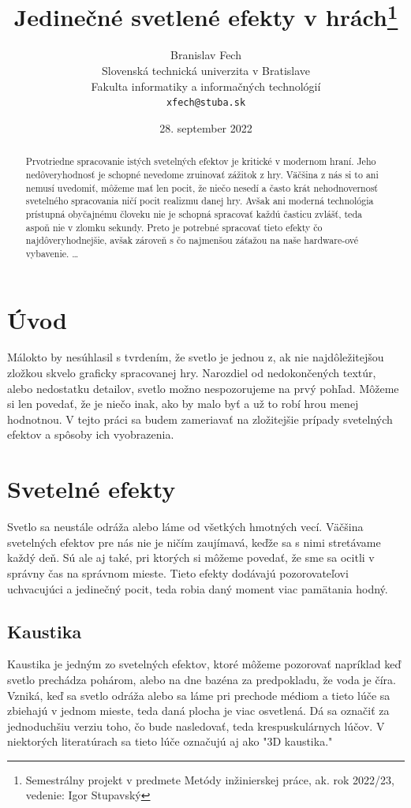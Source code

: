 \documentclass[10pt,twoside,slovak,a4paper]{article}
\title{Jedinečné svetlené efekty v hrách\thanks{Semestrálny projekt v predmete Metódy inžinierskej práce, ak. rok 2022/23, vedenie: Igor Stupavský}} %
\author{Branislav Fech\\[2pt]
	{\small Slovenská technická univerzita v Bratislave}\\
	{\small Fakulta informatiky a informačných technológií}\\
	{\small \texttt{xfech@stuba.sk}}
	}
\date{\small 28. september 2022} %
\begin{document}
\maketitle

\begin{abstract}
Prvotriedne spracovanie istých svetelných efektov je kritické v modernom hraní. 
Jeho nedôveryhodnosť je schopné nevedome zruinovať zážitok z hry. Väčšina z nás 
si to ani nemusí uvedomiť, môžeme mať len pocit, že niečo nesedí a často krát 
nehodnovernosť svetelného spracovania ničí pocit realizmu danej hry. Avšak ani 
moderná technológia prístupná obyčajnému človeku nie je schopná spracovať každú 
časticu zvlášť, teda aspoň nie v zlomku sekundy. Preto je potrebné spracovať tieto 
efekty čo najdôveryhodnejšie, avšak zároveň s čo najmenšou záťažou na naše hardware-ové 
vybavenie.
\ldots
\end{abstract}



\section{Úvod}
Málokto by nesúhlasil s tvrdením, že svetlo je jednou z, ak nie najdôležitejšou zložkou 
skvelo graficky spracovanej hry. Narozdiel od nedokončených textúr, alebo nedostatku 
detailov, svetlo možno nespozorujeme na prvý pohľad. Môžeme si len povedať, že je niečo 
inak, ako by malo byť a už to robí hrou menej hodnotnou. V tejto práci sa budem zameriavať 
na zložitejšie prípady svetelných efektov a spôsoby ich vyobrazenia.

\section{Svetelné efekty} \label{se}
Svetlo sa neustále odráža alebo láme od všetkých hmotných vecí. Väčšina svetelných efektov 
pre nás nie je ničím zaujímavá, keďže sa s nimi stretávame každý deň. Sú ale aj také, pri 
ktorých si môžeme povedať, že sme sa ocitli v správny čas na správnom mieste. Tieto efekty 
dodávajú  pozorovateľovi uchvacujúci a jedinečný pocit, teda robia daný moment viac pamätania 
hodný.

\subsection{Kaustika} \label{se:kaustika}
Kaustika je jedným zo svetelných efektov, ktoré môžeme pozorovať napríklad keď svetlo 
prechádza pohárom, alebo na dne bazéna za predpokladu, že voda je číra. Vzniká, keď sa 
svetlo odráža alebo sa láme pri prechode médiom a tieto lúče sa zbiehajú v jednom mieste, 
teda daná plocha je viac osvetlená. Dá sa označiť za jednoduchšiu verziu toho, čo bude 
nasledovať, teda krespuskulárnych lúčov. V niektorých literatúrach sa tieto lúče označujú 
aj ako "3D kaustika."
\end{document}
